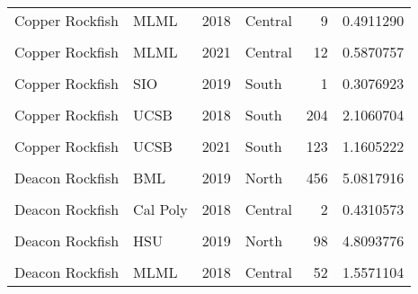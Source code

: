 \documentclass[
]{article}
\begin{document}
\begin{longtable}[t]{llrlrr}
Copper Rockfish & MLML & 2018 & Central & 9 & 0.4911290\\
\cellcolor{gray!6}{Copper Rockfish} & \cellcolor{gray!6}{MLML} & \cellcolor{gray!6}{2019} & \cellcolor{gray!6}{Central} & \cellcolor{gray!6}{6} & \cellcolor{gray!6}{0.7037621}\\
Copper Rockfish & MLML & 2021 & Central & 12 & 0.5870757\\
\addlinespace
\cellcolor{gray!6}{Copper Rockfish} & \cellcolor{gray!6}{SIO} & \cellcolor{gray!6}{2018} & \cellcolor{gray!6}{South} & \cellcolor{gray!6}{1} & \cellcolor{gray!6}{0.2714932}\\
Copper Rockfish & SIO & 2019 & South & 1 & 0.3076923\\
\cellcolor{gray!6}{Copper Rockfish} & \cellcolor{gray!6}{SIO} & \cellcolor{gray!6}{2021} & \cellcolor{gray!6}{South} & \cellcolor{gray!6}{4} & \cellcolor{gray!6}{0.6250000}\\
Copper Rockfish & UCSB & 2018 & South & 204 & 2.1060704\\
\cellcolor{gray!6}{Copper Rockfish} & \cellcolor{gray!6}{UCSB} & \cellcolor{gray!6}{2019} & \cellcolor{gray!6}{South} & \cellcolor{gray!6}{158} & \cellcolor{gray!6}{1.6735266}\\
\addlinespace
Copper Rockfish & UCSB & 2021 & South & 123 & 1.1605222\\
\cellcolor{gray!6}{Deacon Rockfish} & \cellcolor{gray!6}{BML} & \cellcolor{gray!6}{2018} & \cellcolor{gray!6}{North} & \cellcolor{gray!6}{419} & \cellcolor{gray!6}{4.4983758}\\
Deacon Rockfish & BML & 2019 & North & 456 & 5.0817916\\
\cellcolor{gray!6}{Deacon Rockfish} & \cellcolor{gray!6}{BML} & \cellcolor{gray!6}{2021} & \cellcolor{gray!6}{North} & \cellcolor{gray!6}{240} & \cellcolor{gray!6}{3.7611986}\\
Deacon Rockfish & Cal Poly & 2018 & Central & 2 & 0.4310573\\
\addlinespace
\cellcolor{gray!6}{Deacon Rockfish} & \cellcolor{gray!6}{HSU} & \cellcolor{gray!6}{2018} & \cellcolor{gray!6}{North} & \cellcolor{gray!6}{38} & \cellcolor{gray!6}{2.5164192}\\
Deacon Rockfish & HSU & 2019 & North & 98 & 4.8093776\\
\cellcolor{gray!6}{Deacon Rockfish} & \cellcolor{gray!6}{HSU} & \cellcolor{gray!6}{2021} & \cellcolor{gray!6}{North} & \cellcolor{gray!6}{145} & \cellcolor{gray!6}{6.4332095}\\
Deacon Rockfish & MLML & 2018 & Central & 52 & 1.5571104\\

\end{longtable}
\end{document}
